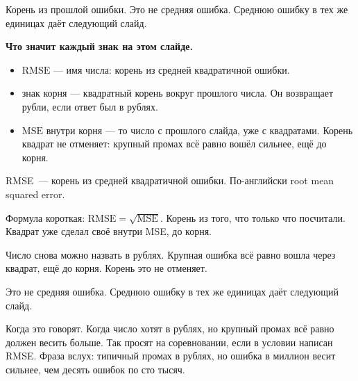 \documentclass[11pt,a4paper]{article}
\newcommand{\slidehead}[2]{\par\vspace{4mm}{\color{navy}\large\bfseries Слайд #1. #2}\par\vspace{1mm}}
\newcommand{\screen}[1]{\par{\color{ink}\small #1\par}\vspace{1mm}}
\newcommand{\say}[1]{\begin{saybox}#1\end{saybox}}
\newenvironment{signs}{\begin{signbox}{\bfseries Что значит каждый знак на этом слайде.}\par\begin{itemize}[leftmargin=1.15em,itemsep=2pt,topsep=3pt,parsep=0pt]}{\end{itemize}\end{signbox}}
\begin{document}
\slidehead{19}{RMSE}
\screen{Корень из прошлой ошибки. Это не средняя ошибка. Среднюю ошибку в тех же единицах даёт следующий слайд.}
\begin{signs}
\item \(\mathrm{RMSE}\) — имя числа: корень из средней квадратичной ошибки.
\item знак корня — квадратный корень вокруг прошлого числа. Он возвращает рубли, если ответ был в рублях.
\item \(\mathrm{MSE}\) внутри корня — то число с прошлого слайда, уже с квадратами. Корень квадрат не отменяет: крупный промах всё равно вошёл сильнее, ещё до корня.
\end{signs}
\say{RMSE~--- корень из средней квадратичной ошибки. По-английски root mean squared error.

Формула короткая: \(\mathrm{RMSE}=\sqrt{\mathrm{MSE}}\). Корень из того, что только что посчитали. Квадрат уже сделал своё внутри MSE, до корня.

Число снова можно назвать в рублях. Крупная ошибка всё равно вошла через квадрат, ещё до корня. Корень это не отменяет.

Это не средняя ошибка. Среднюю ошибку в тех же единицах даёт следующий слайд.

Когда это говорят. Когда число хотят в рублях, но крупный промах всё равно должен весить больше. Так просят на соревновании, если в условии написан RMSE. Фраза вслух: типичный промах в рублях, но ошибка в миллион весит сильнее, чем десять ошибок по сто тысяч.}
\end{document}
